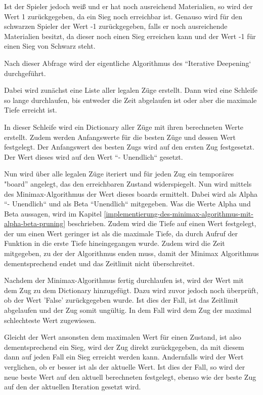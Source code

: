 Ist der Spieler jedoch weiß und er hat noch ausreichend Materialien, so
wird der Wert 1 zurückgegeben, da ein Sieg noch erreichbar ist. Genauso
wird für den schwarzen Spieler der Wert -1 zurückgegeben, falls er noch
ausreichende Materialien besitzt, da dieser noch einen Sieg erreichen
kann und der Wert -1 für einen Sieg von Schwarz steht.

Nach dieser Abfrage wird der eigentliche Algorithmus des ``Iterative
Deepening` durchgeführt.

    Dabei wird zunächst eine Liste aller legalen Züge erstellt. Dann wird
eine Schleife so lange durchlaufen, bis entweder die Zeit abgelaufen ist
oder aber die maximale Tiefe erreicht ist.

In dieser Schleife wird ein Dictionary aller Züge mit ihren berechneten
Werte erstellt. Zudem werden Anfangswerte für die besten Züge und dessen
Wert festgelegt. Der Anfangswert des besten Zugs wird auf den ersten Zug
festgesetzt. Der Wert dieses wird auf den Wert ``- Unendlich`` gesetzt.

Nun wird über alle legalen Züge iteriert und für jeden Zug ein
temporäres "board'' angelegt, das den erreichbaren Zustand widerspiegelt. Nun
wird mittels des Minimax-Algorithmus der Wert dieses boards ermittelt.
Dabei wird als Alpha ``- Unendlich`` und als Beta ``Unendlich`` mitgegeben.
Was die Werte Alpha und Beta aussagen, wird im Kapitel \ref{implementierung-des-minimax-algorithmus-mit-alpha-beta-pruning}
beschrieben. Zudem wird die Tiefe auf einen Wert festgelegt, der um
einen Wert geringer ist als die maximale Tiefe, da durch Aufruf der
Funktion in die erste Tiefe hineingegangen wurde. Zudem wird die Zeit
mitgegeben, zu der der Algorithmus enden muss, damit der Minimax
Algorithmus dementsprechend endet und das Zeitlimit nicht überschreitet.

Nachdem der Minimax-Algorithmus fertig durchlaufen ist, wird der Wert
mit dem Zug zu dem Dictionary hinzugefügt. Dazu wird zuvor jedoch noch überprüft, ob der Wert 'False' zurückgegeben wurde. Ist dies der Fall, ist das Zeitlimit abgelaufen und der Zug somit ungültig. In dem Fall wird dem Zug der maximal schlechteste Wert zugewiesen. 

Gleicht der Wert ansonsten dem maximalen Wert für einen Zustand, ist also dementsprechend ein Sieg,
wird der Zug direkt zurückgegeben, da mit diesem dann auf jeden Fall ein
Sieg erreicht werden kann. Andernfalls wird der Wert verglichen, ob er
besser ist als der aktuelle Wert. Ist dies der Fall, so wird der neue
beste Wert auf den aktuell berechneten festgelegt, ebenso wie der beste
Zug auf den der aktuellen Iteration gesetzt wird.

